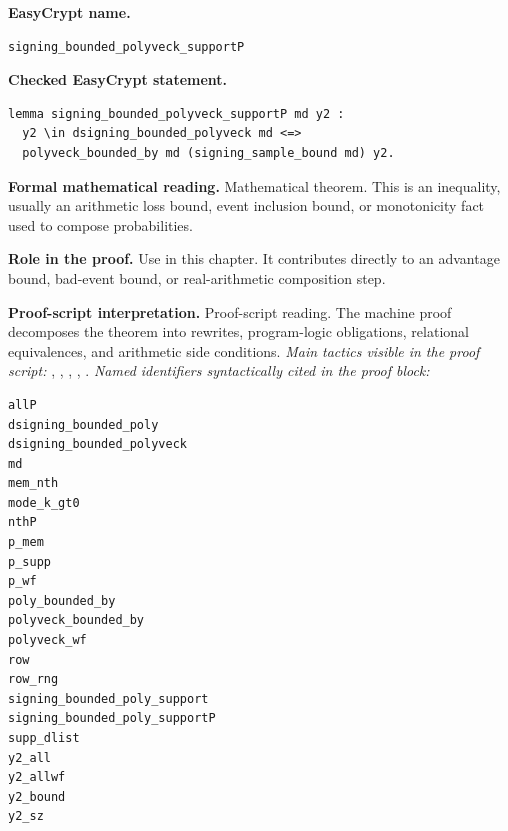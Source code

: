 \begin{formaltheorem}
\noindent\textbf{EasyCrypt name.}
\begin{lstlisting}[language=EasyCrypt,basicstyle=\ttfamily\scriptsize]
signing_bounded_polyveck_supportP
\end{lstlisting}
\noindent\textbf{Checked EasyCrypt statement.}
\begin{lstlisting}[language=EasyCrypt,basicstyle=\ttfamily\scriptsize]
lemma signing_bounded_polyveck_supportP md y2 :
  y2 \in dsigning_bounded_polyveck md <=>
  polyveck_bounded_by md (signing_sample_bound md) y2.
\end{lstlisting}
\noindent\textbf{Formal mathematical reading.}
Mathematical theorem. This is an inequality, usually an arithmetic loss bound, event inclusion bound, or monotonicity fact used to compose probabilities.

\noindent\textbf{Role in the proof.}
Use in this chapter. It contributes directly to an advantage bound, bad-event bound, or real-arithmetic composition step.

\noindent\textbf{Proof-script interpretation.}
Proof-script reading. The machine proof decomposes the theorem into rewrites, program-logic obligations, relational equivalences, and arithmetic side conditions.
\emph{Main tactics visible in the proof script:} , , , , .
\emph{Named identifiers syntactically cited in the proof block:}
\begin{lstlisting}[language=EasyCrypt,basicstyle=\ttfamily\scriptsize]
allP
dsigning_bounded_poly
dsigning_bounded_polyveck
md
mem_nth
mode_k_gt0
nthP
p_mem
p_supp
p_wf
poly_bounded_by
polyveck_bounded_by
polyveck_wf
row
row_rng
signing_bounded_poly_support
signing_bounded_poly_supportP
supp_dlist
y2_all
y2_allwf
y2_bound
y2_sz
\end{lstlisting}

\end{formaltheorem}

